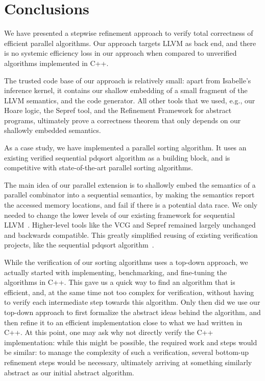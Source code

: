 \documentclass[sn-mathphys,Numbered]{sn-jnl}
\theoremstyle{thmstyleone}%
\theoremstyle{definition}%
\theoremstyle{thmstylethree}%
\begin{document}
  \section{Conclusions}\label{sec:concl}
    We have presented a stepwise refinement approach to verify total correctness of efficient parallel algorithms.
    Our approach targets LLVM as back end, and there is no systemic efficiency loss in our approach
    when compared to unverified algorithms implemented in C++.

    The trusted code base of our approach is relatively small:
    apart from Isabelle's inference kernel, it contains our shallow embedding of a small fragment of
    the LLVM semantics, and the code generator.
    All other tools that we used, e.g., our Hoare logic, the Sepref tool, and the Refinement Framework for abstract programs,
    ultimately prove a correctness theorem that only depends on our shallowly embedded semantics.

    As a case study, we have implemented a parallel sorting algorithm.
    It uses an existing verified sequential pdqsort algorithm as a building block,
    and is competitive with state-of-the-art parallel sorting algorithms.

    The main idea of our parallel extension is to shallowly embed the semantics of a
    parallel combinator into a sequential semantics, by making the
    semantics report the accessed memory locations, and fail if there is a potential data race.
    We only needed to change the lower levels of our existing framework for sequential LLVM~\cite{La19-llvm}.
    Higher-level tools like the VCG and Sepref remained largely unchanged and backwards compatible.
    This greatly simplified reusing of existing verification projects, like the sequential pdqsort algorithm~\cite{La20}.

    While the verification of our sorting algorithms uses a top-down approach, we actually started with
    implementing, benchmarking, and fine-tuning the algorithms in C++. This gave us a quick way to
    find an algorithm that is efficient, and, at the same time not too complex for verification,
    without having to verify each intermediate step towards this algorithm.
    Only then did we use our top-down approach to first formalize the abstract ideas behind the algorithm,
    and then refine it to an efficient implementation close to what we had written in C++.
    At this point, one may ask why not directly verify the C++ implementation: while this might be
    possible, the required work and steps would be similar: to manage the complexity of such a verification,
    several bottom-up refinement steps would be necessary, ultimately arriving at something similarly abstract
    as our initial abstract algorithm.
\end{document}
